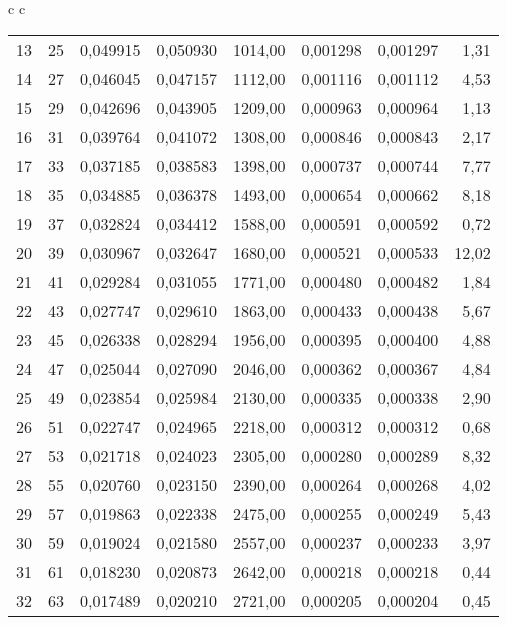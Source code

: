 \begin{center}
\begin{tabular}{c c}
\begin{tabular}{l | c | c c r | c c r}
            13 &      25 &  0,049915 &  0,050930 & 1014,00 & 0,001298 &  0,001297 &    1,31 \\
            14 &      27 &  0,046045 &  0,047157 & 1112,00 & 0,001116 &  0,001112 &    4,53 \\
            15 &      29 &  0,042696 &  0,043905 & 1209,00 & 0,000963 &  0,000964 &    1,13 \\
            16 &      31 &  0,039764 &  0,041072 & 1308,00 & 0,000846 &  0,000843 &    2,17 \\
            17 &      33 &  0,037185 &  0,038583 & 1398,00 & 0,000737 &  0,000744 &    7,77 \\
            18 &      35 &  0,034885 &  0,036378 & 1493,00 & 0,000654 &  0,000662 &    8,18 \\
            19 &      37 &  0,032824 &  0,034412 & 1588,00 & 0,000591 &  0,000592 &    0,72 \\
            20 &      39 &  0,030967 &  0,032647 & 1680,00 & 0,000521 &  0,000533 &   12,02 \\
            21 &      41 &  0,029284 &  0,031055 & 1771,00 & 0,000480 &  0,000482 &    1,84 \\
            22 &      43 &  0,027747 &  0,029610 & 1863,00 & 0,000433 &  0,000438 &    5,67 \\
            23 &      45 &  0,026338 &  0,028294 & 1956,00 & 0,000395 &  0,000400 &    4,88 \\
            24 &      47 &  0,025044 &  0,027090 & 2046,00 & 0,000362 &  0,000367 &    4,84 \\
            25 &      49 &  0,023854 &  0,025984 & 2130,00 & 0,000335 &  0,000338 &    2,90 \\
            26 &      51 &  0,022747 &  0,024965 & 2218,00 & 0,000312 &  0,000312 &    0,68 \\
            27 &      53 &  0,021718 &  0,024023 & 2305,00 & 0,000280 &  0,000289 &    8,32 \\
            28 &      55 &  0,020760 &  0,023150 & 2390,00 & 0,000264 &  0,000268 &    4,02 \\
            29 &      57 &  0,019863 &  0,022338 & 2475,00 & 0,000255 &  0,000249 &    5,43 \\
            30 &      59 &  0,019024 &  0,021580 & 2557,00 & 0,000237 &  0,000233 &    3,97 \\
            31 &      61 &  0,018230 &  0,020873 & 2642,00 & 0,000218 &  0,000218 &    0,44 \\
            32 &      63 &  0,017489 &  0,020210 & 2721,00 & 0,000205 &  0,000204 &    0,45 \\

\end{tabular}
\end{tabular}
\end{center}
